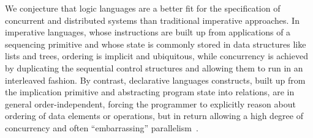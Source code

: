 \begin{comment}
Consider a distributed system in which participants announce their presence with 
\emph{heartbeat} messages; participants that want to reason about who is present must
remember the message content and the time of its arrival.  It is natural to represent the messages 
themselves as events, and the log of messages and timestamps as a persistent table:

\begin{Dedalus}
heartbeat\_cache(@Host, Peer, Time) \(\leftarrow\) 
  heartbeat(@Host, Peer), local\_time(Time);
\end{Dedalus}

 Although the Overlog language permits the transparent
intermixing of the table types, their interaction is often unintuitive, and compromises the
reading of rules as logical implications.  The state of the system after the arrival of some
number of \emph{heartbeat} events is clearly not a minimal model of the given input database,
which does not contain the events that (for one moment) caused the derivation of 
\emph{heartbeat\_cache} tuples.



\end{comment}

We conjecture that logic languages are a better fit for the specification of concurrent and distributed systems than traditional imperative approaches.  In imperative languages, whose instructions are built up from applications of a sequencing primitive and whose state is commonly stored in data structures like lists and trees, ordering is implicit and ubiquitous, 
while concurrency is achieved by duplicating the sequential control structures and allowing them
to run in an interleaved fashion.  By contrast, declarative languages constructs, built up from the implication primitive and abstracting program state into relations, are in general order-independent, forcing the programmer to explicitly reason about ordering of data elements or operations, but in return allowing a high degree of concurrency and often ``embarrassing'' 
parallelism~\cite{podskey}.

